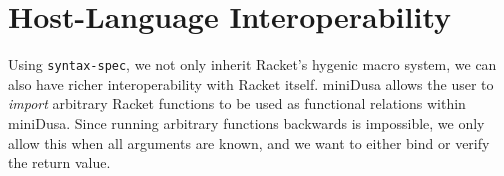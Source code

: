 \documentclass[dvipsnames,sigplan,screen,review,anonymous,acmthm,nonacm]{acmart}
\begin{document}
\section{Host-Language Interoperability}


Using \texttt{syntax-spec}, we not only inherit Racket's hygenic macro system, we can
also have richer interoperability with Racket itself. miniDusa allows the user
to \emph{import} arbitrary Racket functions to be used as functional relations
within miniDusa. Since running arbitrary functions backwards is impossible, we
only allow this when all arguments are known, and we want to either bind or
verify the return value.


\clearpage


\end{document}
